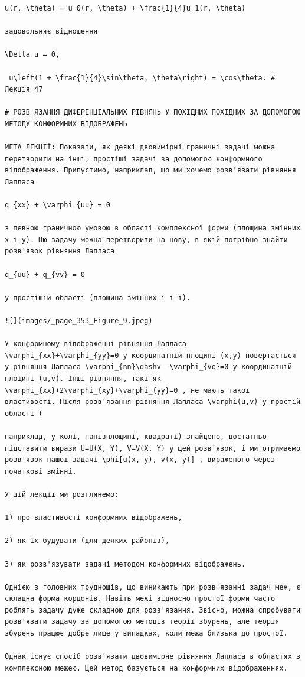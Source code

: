 \documentclass[
  ukrainian,
]{article}
\begin{document}
\begin{verbatim}
u(r, \theta) = u_0(r, \theta) + \frac{1}{4}u_1(r, \theta)

задовольняє відношення

\Delta u = 0,

 u\left(1 + \frac{1}{4}\sin\theta, \theta\right) = \cos\theta. # Лекція 47

# РОЗВ'ЯЗАННЯ ДИФЕРЕНЦІАЛЬНИХ РІВНЯНЬ У ПОХІДНИХ ПОХІДНИХ ЗА ДОПОМОГОЮ МЕТОДУ КОНФОРМНИХ ВІДОБРАЖЕНЬ

МЕТА ЛЕКЦІЇ: Показати, як деякі двовимірні граничні задачі можна перетворити на інші, простіші задачі за допомогою конформного відображення. Припустимо, наприклад, що ми хочемо розв'язати рівняння Лапласа

q_{xx} + \varphi_{uu} = 0

з певною граничною умовою в області комплексної форми (площина змінних x і y). Цю задачу можна перетворити на нову, в якій потрібно знайти розв'язок рівняння Лапласа

q_{uu} + q_{vv} = 0

у простішій області (площина змінних і і і).

![](images/_page_353_Figure_9.jpeg)

У конформному відображенні рівняння Лапласа \varphi_{xx}+\varphi_{yy}=0 у координатній площині (x,y) повертається у рівняння Лапласа \varphi_{nn}\dashv -\varphi_{vo}=0 у координатній площині (u,v). Інші рівняння, такі як \varphi_{xx}+2\varphi_{xy}+\varphi_{yy}=0 , не мають такої властивості. Після розв'язання рівняння Лапласа \varphi(u,v) у простій області (

наприклад, у колі, напівплощині, квадраті) знайдено, достатньо підставити вирази U=U(X, Y), V=V(X, Y) у цей розв'язок, і ми отримаємо розв'язок нашої задачі \phi[u(x, y), v(x, y)] , вираженого через початкові змінні.

У цій лекції ми розглянемо:

1) про властивості конформних відображень,

2) як їх будувати (для деяких районів),

3) як розв'язувати задачі методом конформних відображень.

Однією з головних труднощів, що виникають при розв'язанні задач меж, є складна форма кордонів. Навіть межі відносно простої форми часто роблять задачу дуже складною для розв'язання. Звісно, можна спробувати розв'язати задачу за допомогою методів теорії збурень, але теорія збурень працює добре лише у випадках, коли межа близька до простої.

Однак існує спосіб розв'язати двовимірне рівняння Лапласа в областях з комплексною межею. Цей метод базується на конформних відображеннях.


\end{verbatim}
\end{document}
